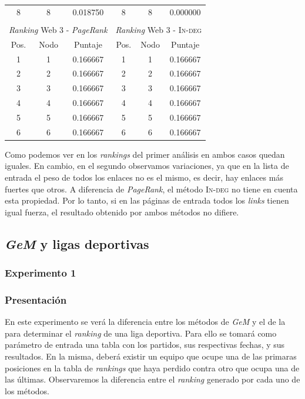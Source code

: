 \begin{center}
\begin{tabular}{|c|c|c||c|c|c|}
                    8    & 8    & 0.018750   & 8    & 8    & 0.000000 \\
                    \multicolumn{6}{c}{} \\ \hline
                    \multicolumn{3}{|c||}{\emph{Ranking} Web 3 - \emph{PageRank}} & \multicolumn{3}{c|}{\emph{Ranking} Web 3 - \textsc{In-deg}} \\ \hline
                    Pos. & Nodo & Puntaje    & Pos. & Nodo & Puntaje  \\ \hline
                    1    & 1    & 0.166667   & 1    & 1    & 0.166667 \\
                    2    & 2    & 0.166667   & 2    & 2    & 0.166667 \\
                    3    & 3    & 0.166667   & 3    & 3    & 0.166667 \\
                    4    & 4    & 0.166667   & 4    & 4    & 0.166667 \\
                    5    & 5    & 0.166667   & 5    & 5    & 0.166667 \\
                    6    & 6    & 0.166667   & 6    & 6    & 0.166667 \\ \hline
                \end{tabular}
            \end{center}

            Como podemos ver en los \emph{rankings} del primer análisis en ambos casos quedan iguales. En cambio, en el segundo observamos variaciones, ya que en la lista de entrada el peso de todos los enlaces no es el mismo, es decir, hay enlaces más fuertes que otros. A diferencia de \emph{PageRank}, el método \textsc{In-deg} no tiene en cuenta esta propiedad. Por lo tanto, si en las páginas de entrada todos los \emph{links} tienen igual fuerza, el resultado obtenido por ambos métodos no difiere.


    \subsection{\emph{GeM} y ligas deportivas}

        \subsubsection{Experimento 1}
        \subsubsection*{Presentación}
        En este experimento se verá la diferencia entre los métodos de \emph{GeM} y el de la  para determinar el \emph{ranking} de una liga deportiva. Para ello se tomará como parámetro de entrada una tabla con los partidos, sus respectivas fechas, y sus resultados. En la misma, deberá existir un equipo que ocupe una de las primaras posiciones en la tabla de \emph{rankings} que haya perdido contra otro que ocupa una de las últimas. Observaremos la diferencia entre el \emph{ranking} generado por cada uno de los métodos.

